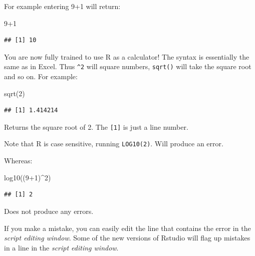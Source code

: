 \documentclass[
]{book}
\newenvironment{Shaded}{\begin{snugshade}}{\end{snugshade}}
\newcommand{\DecValTok}[1]{\textcolor[rgb]{0.00,0.00,0.81}{#1}}
\newcommand{\FunctionTok}[1]{\textcolor[rgb]{0.00,0.00,0.00}{#1}}
\newcommand{\NormalTok}[1]{#1}
\newcommand{\SpecialCharTok}[1]{\textcolor[rgb]{0.00,0.00,0.00}{#1}}
\begin{document}
For example entering 9+1 will return:

\begin{Shaded}
\begin{Highlighting}[]
\DecValTok{9}\SpecialCharTok{+}\DecValTok{1}
\end{Highlighting}
\end{Shaded}

\begin{verbatim}
## [1] 10
\end{verbatim}

You are now fully trained to use R as a calculator! The syntax is essentially the same as in Excel. Thus \texttt{\^{}2} will square numbers, \texttt{sqrt()} will take the square root and so on. For example:

\begin{Shaded}
\begin{Highlighting}[]
\FunctionTok{sqrt}\NormalTok{(}\DecValTok{2}\NormalTok{)}
\end{Highlighting}
\end{Shaded}

\begin{verbatim}
## [1] 1.414214
\end{verbatim}

Returns the square root of 2. The \texttt{{[}1{]}} is just a line number.

Note that R is case sensitive, running \texttt{LOG10(2)}. Will produce an error.

Whereas:

\begin{Shaded}
\begin{Highlighting}[]
\FunctionTok{log10}\NormalTok{((}\DecValTok{9}\SpecialCharTok{+}\DecValTok{1}\NormalTok{)}\SpecialCharTok{\^{}}\DecValTok{2}\NormalTok{)}
\end{Highlighting}
\end{Shaded}

\begin{verbatim}
## [1] 2
\end{verbatim}

Does not produce any errors.

If you make a mistake, you can easily edit the line that contains the error in the \emph{script editing window}. Some of the new versions of Rstudio will flag up mistakes in a line in the \emph{script editing window}.
\end{document}
